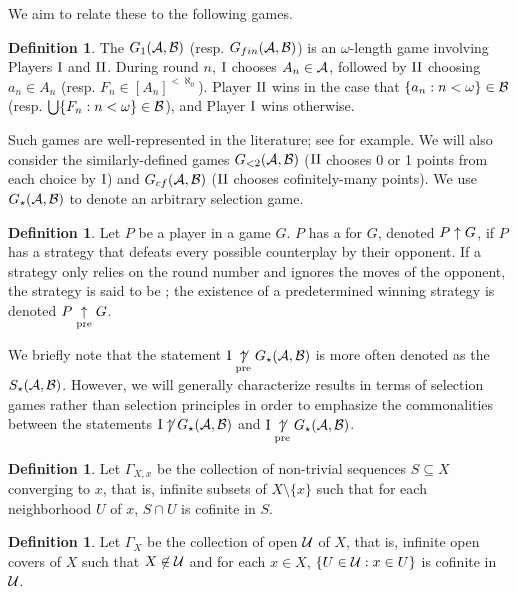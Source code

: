 \documentclass{amsart}
\theoremstyle{plain}
\theoremstyle{definition}
\newtheorem{definition}[theorem]{Definition}
\theoremstyle{remark}
\theoremstyle{plain}
\theoremstyle{definition}
\theoremstyle{remark}
\begin{document}
We aim to relate these to the following games.

\begin{definition}
  The  \(G_1(\mathcal{A},\mathcal{B})\) (resp. \(G_{fin}(\mathcal{A},\mathcal{B})\))
  is an \(\omega\)-length game involving Players \(\mathrm{I}\) and \(\mathrm{II}\). 
  During round \(n\), \(\mathrm{I}\) chooses
  \(A_n\in\mathcal{A}\), followed by \(\mathrm{II}\) choosing \(a_n\in A_n\)
  (resp. \(F_n\in[A_n]^{<\aleph_0}\)).
  Player \(\mathrm{II}\) wins in the case that \(\{a_n:n<\omega\}\in\mathcal{B}\)
  (resp. \(\bigcup\{F_n:n<\omega\}\in\mathcal{B}\)),
  and Player \(\mathrm{I}\) wins otherwise.
\end{definition}

Such games are well-represented in the literature; see \cite{MR1378387}
for example.
We will also consider the similarly-defined games \(G_{<2}(\mathcal{A},\mathcal{B})\)
(\(\mathrm{II}\) chooses 0 or 1 points from each choice by \(\mathrm{I}\)) and \(G_{cf}(\mathcal{A},\mathcal{B})\)
(\(\mathrm{II}\) chooses cofinitely-many points). We use \(G_\star(\mathcal{A},\mathcal{B})\)
to denote an arbitrary selection game.

\begin{definition}
  Let \(P\) be a player in a game \(G\). \(P\) has a 
  for \(G\), denoted \(P\uparrow G\), if \(P\) has a strategy that defeats every
  possible counterplay by their opponent. If a strategy only relies on the
  round number and ignores the moves of the opponent, the strategy is said
  to be ; the existence of a predetermined winning strategy
  is denoted \(P\underset{\text{pre}}{\uparrow} G\).
\end{definition}

We briefly note that the statement \(\mathrm{I}\underset{\text{pre}}{\not\uparrow} G_\star(\mathcal{A},\mathcal{B})\)
is more often denoted as the 
\(S_\star(\mathcal{A},\mathcal{B})\). However, we will generally characterize
results in terms of selection games rather than selection principles
in order to emphasize the commonalities between the statements
\(\mathrm{I}\not\uparrow G_\star(\mathcal{A},\mathcal{B})\) and
\(\mathrm{I}\underset{\text{pre}}{\not\uparrow} G_\star(\mathcal{A},\mathcal{B})\).


\begin{definition}
Let \(\Gamma_{X,x}\) be the collection of non-trivial sequences \(S\subseteq X\) converging to \(x\),
that is, infinite subsets of \(X\setminus\{x\}\) such that for each neighborhood \(U\) of \(x\),
\(S\cap U\) is cofinite in \(S\).
\end{definition}

\begin{definition}
Let \(\Gamma_X\) be the collection of open  \(\mathcal{U}\) of \(X\),
that is, infinite open covers of \(X\) such that \(X\not\in \mathcal{U}\) and for each \(x\in X\),
\(\{U\in\mathcal{U}:x\in U\}\) is cofinite in \(\mathcal{U}\).
\end{definition}
\end{document}
